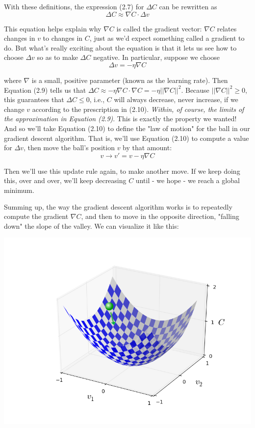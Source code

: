 \documentclass[a4paper,12pt]{report}%
\begin{document}
With these definitions, the expression (2.7) for $\Delta C$ can be rewritten as
\begin{equation}
\Delta C \approx \nabla C \cdot \Delta v
\end{equation}

This equation helps explain why $\nabla C$ is called the gradient vector: $\nabla C$ relates changes in $v$ to changes in $C$, just as we'd expect something called a gradient to do. But what's really exciting about the equation is that it lets us see how to choose $\Delta v$ so as to make $\Delta C$ negative. In particular, suppose we choose
\begin{equation}
\Delta v = − \eta \nabla C
\end{equation}

where $\nabla$ is a small, positive parameter (known as the learning rate). Then Equation (2.9) tells us that $\Delta C \approx −\eta \nabla C \cdot \nabla C = −\eta ||\nabla C ||^{2} $. Because $||\nabla C||^{2} ≥ 0 $, this guarantees that $\Delta C ≤0 $, i.e., $C$ will always decrease, never increase, if we change $v$ according to the prescription in (2.10). {\it Within, of course, the limits of the approximation in Equation (2.9)}. This is exactly the property we wanted! And so we'll take Equation (2.10) to define the "law of motion" for the ball in our gradient descent algorithm. That is, we'll use Equation (2.10) to compute a value for $\Delta v$, then move the ball's position $v$ by that amount:
\begin{equation}
v \rightarrow v' = v - \eta \nabla C
\end{equation}

Then we'll use this update rule again, to make another move. If we keep doing this, over and over, we'll keep decreasing $C$ until - we hope - we reach a global minimum.

Summing up, the way the gradient descent algorithm works is to repeatedly compute the gradient $\nabla C$, and then to move in the opposite direction, "falling down" the slope of the valley. We can visualize it like this:
\begin{center}
 \includegraphics[width=0.85\linewidth]{images/valley_with_ball.png}
\end{center}
\end{document}
